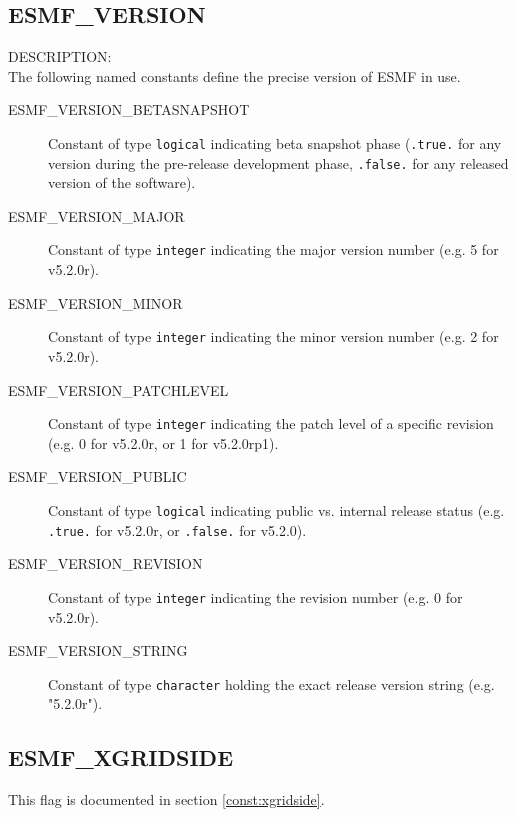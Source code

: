 \subsection{ESMF\_VERSION}
\label{const:version}

{\sf DESCRIPTION:\\}
The following named constants define the precise version of ESMF in use.

\begin{description}
\item [ESMF\_VERSION\_BETASNAPSHOT]
      Constant of type {\tt logical} indicating beta snapshot phase
      ({\tt .true.} for any version during the pre-release development phase,
      {\tt .false.} for any released version of the software).
\item [ESMF\_VERSION\_MAJOR]
      Constant of type {\tt integer} indicating the major version number
      (e.g. 5 for v5.2.0r).
\item [ESMF\_VERSION\_MINOR]
      Constant of type {\tt integer} indicating the minor version number
      (e.g. 2 for v5.2.0r).
\item [ESMF\_VERSION\_PATCHLEVEL]
      Constant of type {\tt integer} indicating the patch level of a specific
      revision (e.g. 0 for v5.2.0r, or 1 for v5.2.0rp1).
\item [ESMF\_VERSION\_PUBLIC]
      Constant of type {\tt logical} indicating public vs. internal release
      status (e.g. {\tt .true.} for v5.2.0r, or {\tt .false.} for v5.2.0).
\item [ESMF\_VERSION\_REVISION]
      Constant of type {\tt integer} indicating the revision number
      (e.g. 0 for v5.2.0r).
\item [ESMF\_VERSION\_STRING]
      Constant of type {\tt character} holding the exact release version string
      (e.g. "5.2.0r").
\end{description}

\subsection{ESMF\_XGRIDSIDE}
This flag is documented in section \ref{const:xgridside}.
